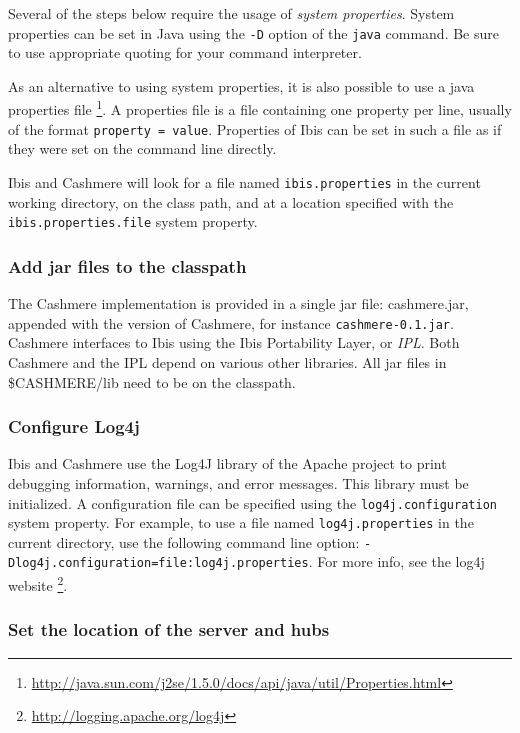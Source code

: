 \documentclass[a4paper,10pt]{article}
\begin{document}
Several of the steps below require the usage of \emph{system properties}.
System properties can be set in Java using the \texttt{-D} option of the
\texttt{java} command. Be sure to use appropriate quoting for your
command interpreter.

As an alternative to using system properties, it is also possible to use
a java properties file
\footnote{\url{http://java.sun.com/j2se/1.5.0/docs/api/java/util/Properties.html}}.
A properties file is a file containing one property per line, usually of
the format \texttt{property = value}. Properties of Ibis can be set in
such a file as if they were set on the command line directly.

Ibis and Cashmere will look for a file named \texttt{ibis.properties} in the
current working directory, on the class path, and at a location specified
with the \texttt{ibis.properties.file} system property.

\subsubsection{Add jar files to the classpath}

The Cashmere implementation is provided in a single jar file: cashmere.jar,
appended with the version of Cashmere, for instance \texttt{cashmere-0.1.jar}.
Cashmere interfaces to Ibis using the Ibis Portability Layer, or
\emph{IPL}. Both Cashmere and the IPL depend on various other libraries.
All jar files in \$CASHMERE/lib need to be on the classpath.

\subsubsection{Configure Log4j}

Ibis and Cashmere use the Log4J library of the Apache project to print debugging
information, warnings, and error messages. This library must be
initialized. A configuration file can be specified using the
\texttt{log4j.configuration} system property. For example, to use a file
named \texttt{log4j.properties} in the current directory, use the
following command line option:
\texttt{-Dlog4j.configuration=file:log4j.properties}. For more info,
see the log4j website \footnote{\url{http://logging.apache.org/log4j}}.

\subsubsection{Set the location of the server and hubs}
\end{document}
